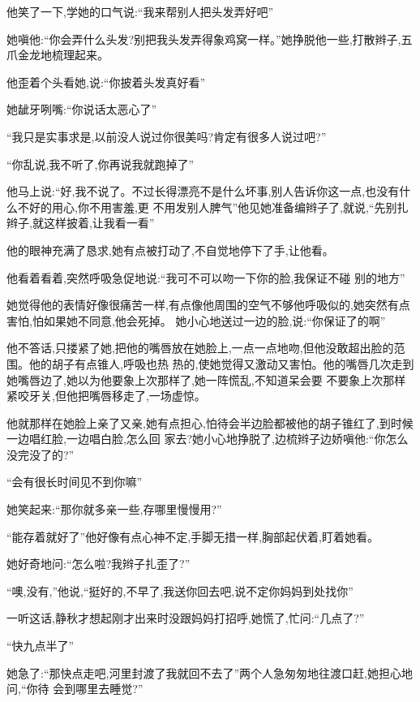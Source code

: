 ﻿\documentclass[12pt]{article}
\begin{document}
他笑了一下,学她的口气说:``我来帮别人把头发弄好吧\myrule ''

她嗔他:``你会弄什么头发?别把我头发弄得象鸡窝一样。''她挣脱他一些,打散辫子,五爪金龙地梳理起来。

他歪着个头看她,说:``你\myrule 披着头发\myrule 真好看\myrule ''

她龇牙咧嘴:``你说话\myrule 太恶心了\myrule ''

``我只是实事求是,以前没人说过你\myrule 很美吗?肯定有很多人说过吧?''

``你乱说,我不听了,你再说我就\myrule 跑掉了\myrule ''

他马上说:``好,我不说了。不过长得漂亮不是什么坏事,别人告诉你这一点,也没有什么不好的用心,你不用害羞,更
不用发别人脾气\myrule ''他见她准备编辫子了,就说,``先别扎辫子,就这样披着,让我看一看\myrule ''

他的眼神充满了恳求,她有点被打动了,不自觉地停下了手,让他看。

他看着看着,突然呼吸急促地说:``我\myrule 可不可以\myrule 吻一下你\myrule 的脸\myrule ,我保证不碰
\myrule 别的地方\myrule ''

她觉得他的表情好像很痛苦一样,有点像他周围的空气不够他呼吸似的,她突然有点害怕,怕如果她不同意,他会死掉。
她小心地送过一边的脸,说:``你保证了的啊\myrule ''

他不答话,只搂紧了她,把他的嘴唇放在她脸上,一点一点地吻,但他没敢超出脸的范围。他的胡子有点锥人,呼吸也热
热的,使她觉得又激动又害怕。他的嘴唇几次走到她嘴唇边了,她以为他要象上次那样了,她一阵慌乱,不知道呆会要
不要象上次那样紧咬牙关,但他把嘴唇移走了,一场虚惊。

他就那样在她脸上亲了又亲,她有点担心,怕待会半边脸都被他的胡子锥红了,到时候一边唱红脸,一边唱白脸,怎么回
家去?她小心地挣脱了,边梳辫子边娇嗔他:``你\myrule 怎么没完没了的?''

``会有很长时间见不到你嘛\myrule ''

她笑起来:``那你就\myrule 多\myrule 亲一些,存哪里慢慢用?''

``能存着就好了\myrule ''他好像有点心神不定,手脚无措一样,胸部起伏着,盯着她看。

她好奇地问:``怎么啦?我辫子扎歪了?''

``噢,没有,''他说,``挺好的\myrule ,不早了,我送你回去吧,说不定你妈妈到处找你\myrule ''

一听这话,静秋才想起刚才出来时没跟妈妈打招呼,她慌了,忙问:``几点了?''

``快九点半了\myrule ''

她急了:``那快点走吧,河里封渡了我就回不去了\myrule ''两个人急匆匆地往渡口赶,她担心地问,``你\myrule 待
会到哪里去睡觉?''
\end{document}
